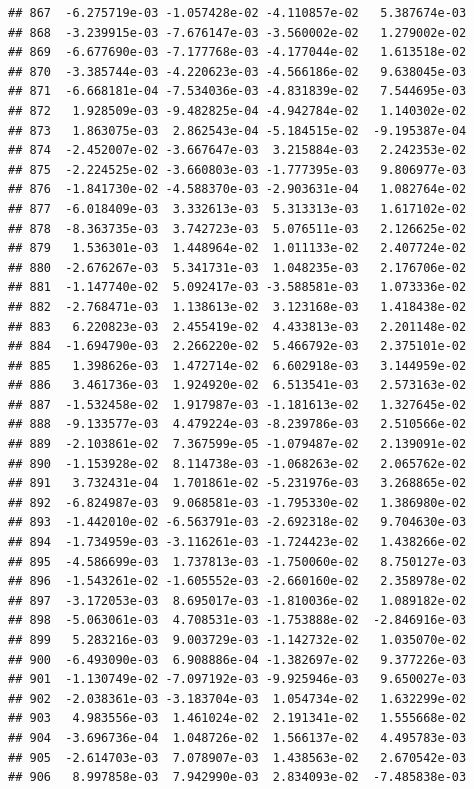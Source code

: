 \documentclass[
]{article}
\begin{document}
\begin{verbatim}
## 867  -6.275719e-03 -1.057428e-02 -4.110857e-02   5.387674e-03
## 868  -3.239915e-03 -7.676147e-03 -3.560002e-02   1.279002e-02
## 869  -6.677690e-03 -7.177768e-03 -4.177044e-02   1.613518e-02
## 870  -3.385744e-03 -4.220623e-03 -4.566186e-02   9.638045e-03
## 871  -6.668181e-04 -7.534036e-03 -4.831839e-02   7.544695e-03
## 872   1.928509e-03 -9.482825e-04 -4.942784e-02   1.140302e-02
## 873   1.863075e-03  2.862543e-04 -5.184515e-02  -9.195387e-04
## 874  -2.452007e-02 -3.667647e-03  3.215884e-03   2.242353e-02
## 875  -2.224525e-02 -3.660803e-03 -1.777395e-03   9.806977e-03
## 876  -1.841730e-02 -4.588370e-03 -2.903631e-04   1.082764e-02
## 877  -6.018409e-03  3.332613e-03  5.313313e-03   1.617102e-02
## 878  -8.363735e-03  3.742723e-03  5.076511e-03   2.126625e-02
## 879   1.536301e-03  1.448964e-02  1.011133e-02   2.407724e-02
## 880  -2.676267e-03  5.341731e-03  1.048235e-03   2.176706e-02
## 881  -1.147740e-02  5.092417e-03 -3.588581e-03   1.073336e-02
## 882  -2.768471e-03  1.138613e-02  3.123168e-03   1.418438e-02
## 883   6.220823e-03  2.455419e-02  4.433813e-03   2.201148e-02
## 884  -1.694790e-03  2.266220e-02  5.466792e-03   2.375101e-02
## 885   1.398626e-03  1.472714e-02  6.602918e-03   3.144959e-02
## 886   3.461736e-03  1.924920e-02  6.513541e-03   2.573163e-02
## 887  -1.532458e-02  1.917987e-03 -1.181613e-02   1.327645e-02
## 888  -9.133577e-03  4.479224e-03 -8.239786e-03   2.510566e-02
## 889  -2.103861e-02  7.367599e-05 -1.079487e-02   2.139091e-02
## 890  -1.153928e-02  8.114738e-03 -1.068263e-02   2.065762e-02
## 891   3.732431e-04  1.701861e-02 -5.231976e-03   3.268865e-02
## 892  -6.824987e-03  9.068581e-03 -1.795330e-02   1.386980e-02
## 893  -1.442010e-02 -6.563791e-03 -2.692318e-02   9.704630e-03
## 894  -1.734959e-03 -3.116261e-03 -1.724423e-02   1.438266e-02
## 895  -4.586699e-03  1.737813e-03 -1.750060e-02   8.750127e-03
## 896  -1.543261e-02 -1.605552e-03 -2.660160e-02   2.358978e-02
## 897  -3.172053e-03  8.695017e-03 -1.810036e-02   1.089182e-02
## 898  -5.063061e-03  4.708531e-03 -1.753888e-02  -2.846916e-03
## 899   5.283216e-03  9.003729e-03 -1.142732e-02   1.035070e-02
## 900  -6.493090e-03  6.908886e-04 -1.382697e-02   9.377226e-03
## 901  -1.130749e-02 -7.097192e-03 -9.925946e-03   9.650027e-03
## 902  -2.038361e-03 -3.183704e-03  1.054734e-02   1.632299e-02
## 903   4.983556e-03  1.461024e-02  2.191341e-02   1.555668e-02
## 904  -3.696736e-04  1.048726e-02  1.566137e-02   4.495783e-03
## 905  -2.614703e-03  7.078907e-03  1.438563e-02   2.670542e-03
## 906   8.997858e-03  7.942990e-03  2.834093e-02  -7.485838e-03

\end{verbatim}
\end{document}
